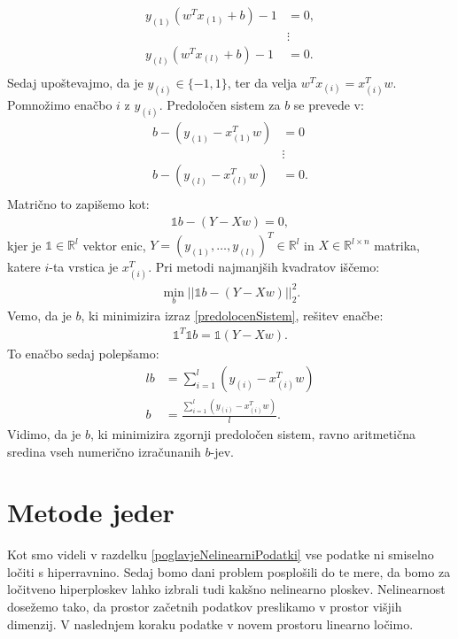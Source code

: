 \documentclass[mat1]{fmfdelo}
\newcommand{\R}{\mathbb R}
\begin{document}
\begin{align*}
y_{(1)}(w^Tx_{(1)} + b)- 1 &= 0,\\
&\vdots \\
y_{(l)}(w^Tx_{(l)} + b)- 1 &= 0.\\
\end{align*} 
Sedaj upoštevajmo, da je $y_{(i)} \in\{-1,1\}$, ter da velja $w^Tx_{(i)} =x_{(i)}^Tw$. Pomnožimo enačbo $i$ z $y_{(i)}$. Predoločen sistem za $b$ se prevede v:
\begin{align*}
b  -(y_{(1)}  - x_{(1)}^Tw) &= 0\\
&\vdots \\
b  -(y_{(l)}  - x_{(l)}^Tw) &= 0.\\
\end{align*}
Matrično to zapišemo kot:
\begin{align*}
\mathds{1}b - (Y - Xw)= 0,
\end{align*}
kjer je $\mathds{1} \in \R^l$ vektor enic, $Y = (y_{(1)}, \ldots, y_{(l)})^T \in \R^l$ in $X \in \R^{l\times n}$ matrika, katere $i$-ta vrstica je $x_{(i)}^T$. Pri metodi najmanjših kvadratov iščemo:
\begin{align}
\label{predolocenSistem}
\min_{b}||\mathds{1}b - (Y - Xw)||^2_2.
\end{align} 
Vemo, da je $b$, ki minimizira izraz \eqref{predolocenSistem}, rešitev enačbe:
\begin{align*}
\mathds{1}^T\mathds{1}b = \mathds{1}(Y - Xw).
\end{align*}
To enačbo sedaj polepšamo: 
\begin{align*}
lb &= \sum_{i=1}^{l}(y_{(i)} - x_{(i)}^Tw)\\
b &= \frac{\sum_{i=1}^{l}(y_{(i)} - x_{(i)}^Tw)}{l}.
\end{align*}
Vidimo, da je $b$, ki minimizira zgornji predoločen sistem, ravno aritmetična sredina vseh numerično izračunanih $b$-jev. 

\section{Metode jeder}\label{PoglavjeMetodeJeder}
Kot smo videli v razdelku \ref{poglavjeNelinearniPodatki} vse podatke ni smiselno ločiti s hiperravnino. Sedaj bomo dani problem posplošili do te mere, da bomo za ločitveno hiperploskev lahko izbrali tudi kakšno nelinearno ploskev. Nelinearnost dosežemo tako, da prostor začetnih podatkov preslikamo v prostor višjih dimenzij. V naslednjem koraku podatke v novem prostoru linearno ločimo.
\end{document}

